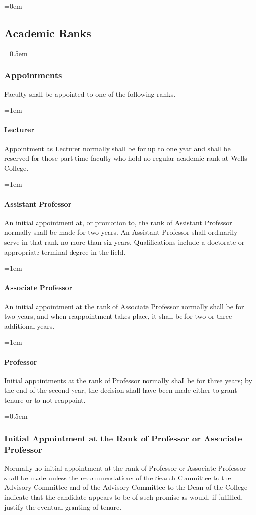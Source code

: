 \documentclass{manual}
\let\oldsubsection\subsection
\renewcommand\subsection{\leftskip=0em\oldsubsection}
\let\oldsubsubsection\subsubsection
\renewcommand\subsubsection{\leftskip=0.5em\oldsubsubsection}
\let\oldparagraph\paragraph
\renewcommand\paragraph{\leftskip=1em\oldparagraph}
\begin{document}
\subsection{Academic Ranks}\label{sec:AcademicRanks}

\subsubsection{Appointments}
Faculty shall be appointed to one of the following ranks.

\paragraph{Lecturer}
Appointment as Lecturer normally shall be for up to one year and shall be reserved for those part-time faculty who hold no regular academic rank at Wells College.

\paragraph{Assistant Professor}
An initial appointment at, or promotion to, the rank of Assistant Professor normally shall be made for two years. An Assistant Professor shall ordinarily serve in that rank no more than six years. Qualifications include a doctorate or appropriate terminal degree in the field.

\paragraph{Associate Professor}
An initial appointment at the rank of Associate Professor normally shall be for two years, and when reappointment takes place, it shall be for two or three additional years.

\paragraph{Professor}
Initial appointments at the rank of Professor normally shall be for three years; by the end of the second year, the decision shall have been made either to grant tenure or to not reappoint.

\subsubsection{Initial Appointment at the Rank of Professor or Associate Professor}
Normally no initial appointment at the rank of Professor or Associate Professor shall be made unless the recommendations of the Search Committee to the Advisory Committee and of the Advisory Committee to the Dean of the College indicate that the candidate appears to be of such promise as would, if fulfilled, justify the eventual granting of tenure.
\end{document}
